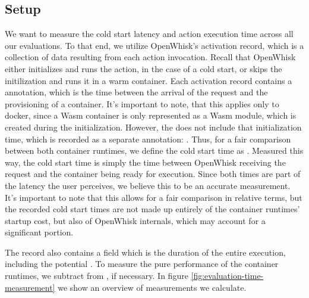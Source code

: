 
\subsection{Setup}

We want to measure the cold start latency and action execution time across all our evaluations. To that end, we utilize OpenWhisk's activation record, which is a collection of data resulting from each action invocation.  Recall that OpenWhisk either initializes and runs the action, in the case of a cold start, or skips the initilization and runs it in a warm container. Each activation record contains a  annotation, which is the time between the arrival of the request and the provisioning of a container. It's important to note, that this applies only to docker, since a Wasm container is only represented as a Wasm module, which is created during the initialization. However, the  does not include that initialization time, which is recorded as a separate annotation: . Thus, for a fair comparison between both container runtimes, we define the cold start time as . Measured this way, the cold start time is simply the time between OpenWhisk receiving the request and the container being ready for execution. Since both times are part of the latency the user perceives, we believe this to be an accurate measurement. It's important to note that this allows for a fair comparison in relative terms, but the recorded cold start times are not made up entirely of the container runtimes' startup cost, but also of OpenWhisk internals, which may account for a significant portion.

The record also contains a  field which is the duration of the entire execution, including the potential . To measure the pure performance of the container runtimes, we subtract  from , if necessary. In figure \ref{fig:evaluation-time-measurement} we show an overview of measurements we calculate.


